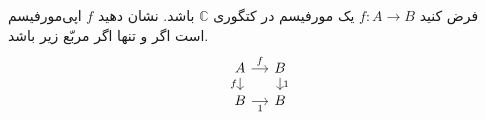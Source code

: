 فرض کنید $f : A \to B$ یک مورفیسم در کتگوری $\mathbb{C}$ باشد. نشان دهید $f$ اپی‌مورفیسم است اگر و تنها اگر مربّع زیر  باشد.
\vspace{-7mm}
$$
\begin{tikzcd}[sep=small]
  A \arrow[r, "f"] \arrow[d, "f"'] & B \arrow[d, "1"] \\
  B \arrow[r, "1"']                & B               
\end{tikzcd}
$$